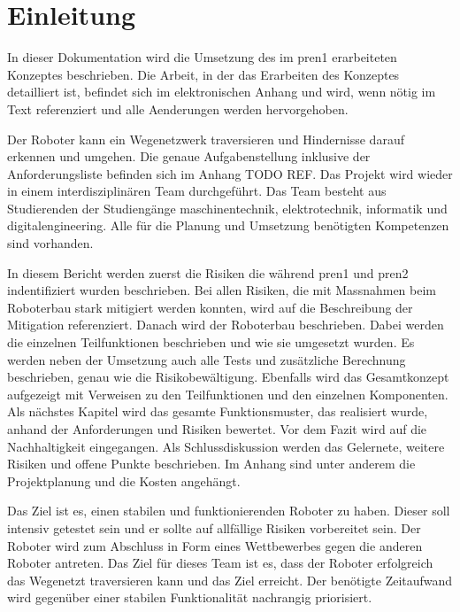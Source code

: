 \section{Einleitung}

In dieser Dokumentation wird die Umsetzung des im \acrfull{pren1} erarbeiteten Konzeptes beschrieben. 
Die Arbeit, in der das Erarbeiten des Konzeptes detailliert ist, befindet sich im elektronischen Anhang und wird, wenn nötig im Text referenziert und alle Aenderungen werden hervorgehoben.

Der Roboter kann ein Wegenetzwerk traversieren und Hindernisse darauf erkennen und umgehen. Die genaue Aufgabenstellung inklusive der Anforderungsliste befinden sich im Anhang TODO REF. Das Projekt wird wieder in einem interdisziplinären Team durchgeführt. Das Team besteht aus Studierenden der Studiengänge \acrfull{maschinentechnik}, \acrfull{elektrotechnik}, \acrfull{informatik} und \acrfull{digitalengineering}. Alle für die Planung und Umsetzung benötigten Kompetenzen sind vorhanden.

In diesem Bericht werden zuerst die Risiken die während \acrshort{pren1} und \acrshort{pren2} indentifiziert wurden beschrieben. Bei allen Risiken, die mit Massnahmen beim Roboterbau stark mitigiert werden konnten, wird auf die Beschreibung der Mitigation referenziert. Danach wird der Roboterbau beschrieben. Dabei werden die einzelnen Teilfunktionen beschrieben und wie sie umgesetzt wurden. Es werden neben der Umsetzung auch alle Tests und zusätzliche Berechnung beschrieben, genau wie die Risikobewältigung. Ebenfalls wird das Gesamtkonzept aufgezeigt mit Verweisen zu den Teilfunktionen und den einzelnen Komponenten. Als nächstes Kapitel wird das gesamte Funktionsmuster, das realisiert wurde, anhand der Anforderungen und Risiken bewertet. Vor dem Fazit wird auf die Nachhaltigkeit eingegangen. Als Schlussdiskussion werden das Gelernete, weitere Risiken und offene Punkte beschrieben. Im Anhang sind unter anderem die Projektplanung und die Kosten angehängt.


Das Ziel ist es, einen stabilen und funktionierenden Roboter zu haben. Dieser soll intensiv getestet sein und er sollte auf allfällige Risiken vorbereitet sein. Der Roboter wird zum Abschluss in Form eines Wettbewerbes gegen die anderen Roboter antreten. Das Ziel für dieses Team ist es, dass der Roboter erfolgreich das Wegenetzt traversieren kann und das Ziel erreicht. Der benötigte Zeitaufwand wird gegenüber einer stabilen Funktionalität nachrangig priorisiert.

